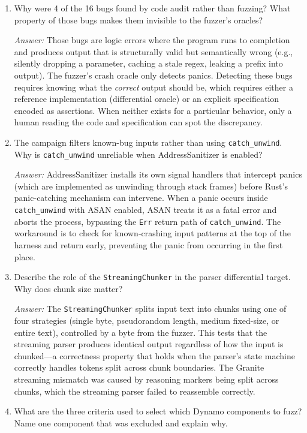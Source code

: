 \begin{enumerate}
  \item Why were 4 of the 16 bugs found by code audit rather than fuzzing? What property of those bugs makes them invisible to the fuzzer's oracles?

  \emph{Answer:} Those bugs are logic errors where the program runs to completion and produces output that is structurally valid but semantically wrong (e.g., silently dropping a parameter, caching a stale regex, leaking a prefix into output). The fuzzer's crash oracle only detects panics. Detecting these bugs requires knowing what the \emph{correct} output should be, which requires either a reference implementation (differential oracle) or an explicit specification encoded as assertions. When neither exists for a particular behavior, only a human reading the code and specification can spot the discrepancy.

  \item The campaign filters known-bug inputs rather than using \texttt{catch\_unwind}. Why is \texttt{catch\_unwind} unreliable when AddressSanitizer is enabled?

  \emph{Answer:} AddressSanitizer installs its own signal handlers that intercept panics (which are implemented as unwinding through stack frames) before Rust's panic-catching mechanism can intervene. When a panic occurs inside \texttt{catch\_unwind} with ASAN enabled, ASAN treats it as a fatal error and aborts the process, bypassing the \texttt{Err} return path of \texttt{catch\_unwind}. The workaround is to check for known-crashing input patterns at the top of the harness and return early, preventing the panic from occurring in the first place.

  \item Describe the role of the \texttt{StreamingChunker} in the parser differential target. Why does chunk size matter?

  \emph{Answer:} The \texttt{StreamingChunker} splits input text into chunks using one of four strategies (single byte, pseudorandom length, medium fixed-size, or entire text), controlled by a byte from the fuzzer. This tests that the streaming parser produces identical output regardless of how the input is chunked---a correctness property that holds when the parser's state machine correctly handles tokens split across chunk boundaries. The Granite streaming mismatch was caused by reasoning markers being split across chunks, which the streaming parser failed to reassemble correctly.

  \item What are the three criteria used to select which Dynamo components to fuzz? Name one component that was excluded and explain why.


\end{enumerate}
